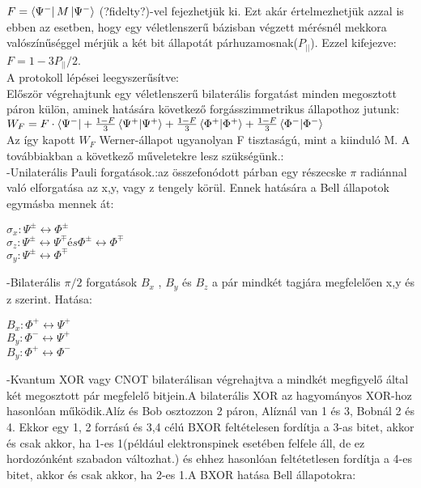 $ F= \bra{\Psi^-}M\ket{\Psi^-} $ 
(?fidelty?)-vel fejezhetjük ki. Ezt akár értelmezhetjük azzal is ebben az esetben, hogy egy véletlenszerű bázisban végzett mérésnél mekkora valószínűséggel mérjük a két bit állapotát párhuzamosnak($P_{||}$). Ezzel kifejezve: 
$F = 1 - 3P_{||}/2$. \\
A protokoll lépései leegyszerűsítve:\\
Először végrehajtunk egy véletlenszerű bilaterális forgatást minden megosztott páron külön, aminek hatására következő forgásszimmetrikus állapothoz jutunk:\\
$ W_F = F \cdot \bra{\Psi^-} + \frac{1-F}{3}\bra{\Psi^+}\ket{\Psi^+} + \frac{1-F}{3}\bra{\Phi^+}\ket{\Phi^+} + \frac{1-F}{3}\bra{\Phi^-}\ket{\Phi^-} $
\\
Az így kapott $W_F$  Werner-állapot ugyanolyan F tisztaságú, mint a kiinduló M. A továbbiakban a következő műveletekre lesz szükségünk.:\\
-Unilaterális Pauli forgatások.:az összefonódott párban egy részecske  $\pi$ radiánnal való elforgatása az x,y, vagy z tengely körül. Ennek hatására a Bell állapotok egymásba mennek át: \\
\begin{center}
$\sigma_x : \Psi^\pm \leftrightarrow \Phi^\pm $\\
$\sigma_z : \Psi^\pm \leftrightarrow \Psi^\mp és \Phi^\pm \leftrightarrow \Phi^\mp $ \\
$\sigma_y : \Psi^\pm \leftrightarrow \Phi^\mp $
\end{center}
-Bilaterális $\pi/2$ forgatások $B_x$ , $B_y$ és $B_z$ a pár mindkét tagjára megfelelően x,y és z szerint. Hatása:\\
\begin{center}
$B_x : \Phi^+ \leftrightarrow \Psi^+$ \\
$B_y : \Phi^- \leftrightarrow \Psi^+$ \\
$B_y : \Phi^+ \leftrightarrow \Phi^-$
\end{center}
-Kvantum XOR vagy CNOT bilaterálisan végrehajtva a mindkét megfigyelő által két megosztott pár megfelelő bitjein.A bilaterális XOR az hagyományos XOR-hoz hasonlóan működik.Alíz és Bob osztozzon 2 páron, Alíznál van 1 és 3, Bobnál 2 és 4. Ekkor egy 1, 2  forrású és 3,4 célú BXOR feltételesen fordítja a 3-as bitet, akkor és csak akkor, ha 1-es 1(például elektronspinek esetében felfele áll, de ez hordozónként szabadon változhat.) és ehhez hasonlóan feltétetlesen fordítja a 4-es bitet, akkor és csak akkor, ha 2-es 1.A BXOR hatása Bell állapotokra:\\
